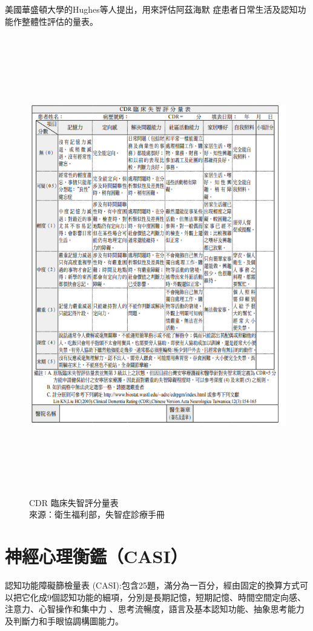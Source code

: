 美國華盛頓大學的Hughes等人提出，用來評估阿茲海默 症患者日常生活及認知功能作整體性評估的量表。

\begin{figure}[H]
	\centerline{\includegraphics[height=20cm]{pic/CDR.PNG}}
	\caption{CDR 臨床失智評分量表\\來源：衛生福利部，失智症診療手冊}
	
	\label{fig:CDR}
\end{figure}




\section{神經心理衡鑑（CASI）}
認知功能障礙篩檢量表 (CASI):包含25題，滿分為一百分，經由固定的換算方式可以把它化成9個認知功能的細項，分別是長期記憶，短期記憶、時間空間定向感、注意力、心智操作和集中力 、思考流暢度，語言及基本認知功能、抽象思考能力及判斷力和手眼協調構圖能力。



%

%

